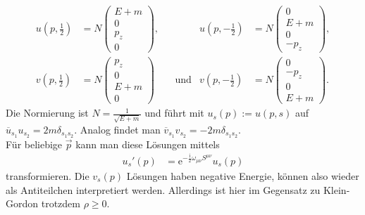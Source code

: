 \documentclass[english, parskip=full]{scrreport}
\newcommand{\kla}{}
\newcommand{\tecxt}{}
\renewcommand{\i}{\text{i}}
\newcommand{\e}{\text{e}}
\begin{document}
\begin{align}
u\kla\left( p, \frac{1}{2} \right) &= N\begin{pmatrix}
E + m \\ 0 \\ p_z \\ 0
\end{pmatrix}, &&& u\kla\left( p, -\frac{1}{2} \right) &= N\begin{pmatrix}
0 \\ E + m \\ 0 \\ -p_z
\end{pmatrix}, \\
v\kla\left( p, \frac{1}{2} \right) &= N\begin{pmatrix}
p_z \\ 0 \\ E + m \\ 0
\end{pmatrix} &&\tecxt\text{und}& v\kla\left( p, -\frac{1}{2} \right) &= N\begin{pmatrix}
0 \\ -p_z \\ 0 \\ E + m
\end{pmatrix}.
\end{align}
Die Normierung ist $N=\frac{1}{\sqrt{E+m}}$ und führt mit $u_s(p) := u(p,s)$ auf $\overline{u}_{s_1}u_{s_2} = 2m\delta_{s_1s_2}$.
Analog findet man $\overline{v}_{s_1}v_{s_2} = -2m\delta_{s_1s_2}$. 
\\
Für beliebige $\vec{p}$ kann man diese Lösungen mittels
\begin{align}
u_s'(p) &= \e^{-\frac{\i}{2}\omega_{\mu\nu}S^{\mu\nu}}u_s(p) 
\end{align}
transformieren.
Die $v_s(p)$ Lösungen haben negative Energie, können also wieder als Antiteilchen interpretiert werden.
Allerdings ist hier im Gegensatz zu Klein-Gordon trotzdem $\rho\ge 0$.
\end{document}

